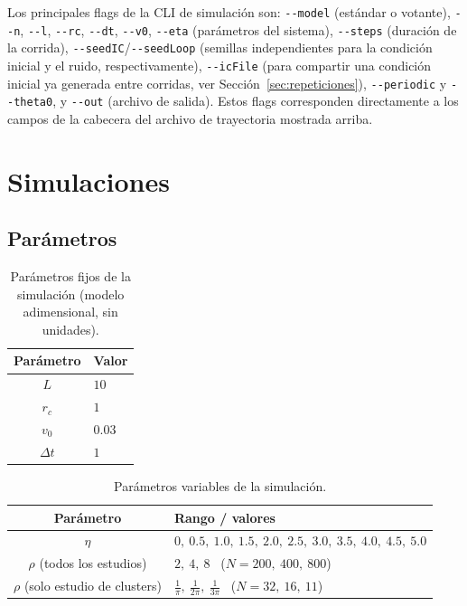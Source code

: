 \documentclass[a4paper,11pt]{article}
\begin{document}
Los principales flags de la CLI de simulación son: \texttt{-{}-model}
(estándar o votante), \texttt{-{}-n}, \texttt{-{}-l}, \texttt{-{}-rc}, \texttt{-{}-dt},
\texttt{-{}-v0}, \texttt{-{}-eta} (parámetros del sistema), \texttt{-{}-steps}
(duración de la corrida), \texttt{-{}-seedIC}/\texttt{-{}-seedLoop} (semillas
independientes para la condición inicial y el ruido, respectivamente),
\texttt{-{}-icFile} (para compartir una condición inicial ya generada entre
corridas, ver Sección~\ref{sec:repeticiones}), \texttt{-{}-periodic} y
\texttt{-{}-theta0}, y \texttt{-{}-out} (archivo de salida). Estos flags
corresponden directamente a los campos de la cabecera del archivo de
trayectoria mostrada arriba.

\section{Simulaciones}
\label{sec:simulaciones}

\subsection{Parámetros}

\begin{table}[H]
  \centering
  \caption{Parámetros fijos de la simulación (modelo adimensional, sin unidades).}
  \label{tab:parametros-fijos}
  \begin{tabular}{cl}
    \hline
    Parámetro & Valor \\
    \hline
    $L$ & $10$ \\
    $r_c$ & $1$ \\
    $v_0$ & $0.03$ \\
    $\Delta t$ & $1$ \\
    \hline
  \end{tabular}
\end{table}

\begin{table}[H]
  \centering
  \caption{Parámetros variables de la simulación.}
  \label{tab:parametros-variables}
  \begin{tabular}{cl}
    \hline
    Parámetro & Rango / valores \\
    \hline
    $\eta$ & $0,\ 0.5,\ 1.0,\ 1.5,\ 2.0,\ 2.5,\ 3.0,\ 3.5,\ 4.0,\ 4.5,\ 5.0$ \\
    $\rho$ (todos los estudios) & $2,\ 4,\ 8$ \ ($N = 200,\ 400,\ 800$) \\
    $\rho$ (solo estudio de clusters) & $\tfrac{1}{\pi},\ \tfrac{1}{2\pi},\ \tfrac{1}{3\pi}$ \ ($N = 32,\ 16,\ 11$) \\
    \hline
  \end{tabular}
\end{table}
\end{document}
